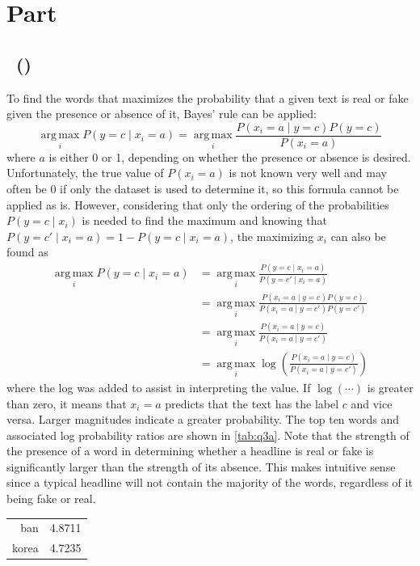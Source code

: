 \documentclass{article}
\DeclareMathOperator*{\argmax}{arg\,max}
\newcommand{\enterproblemHeader}[1]{
}
\newcommand{\exitproblemHeader}[1]{
}
\newcounter{problem} %
\newcommand{\problemName}{}
\newenvironment{problem}[1][Part \theproblem]{ %
	\stepcounter{problem} %
	\renewcommand{\problemName}{#1} %
	\section{\problemName} %
	\enterproblemHeader{\problemName} %
}{
	\exitproblemHeader{\problemName} %
}
\newcounter{subproblem}[problem]
\newcommand{\subproblemName}{}
\newenvironment{subproblem}[1][\theproblem~(\alph{subproblem})]{ %
	\stepcounter{subproblem}
	\renewcommand{\subproblemName}{#1} %
	\subsection{\subproblemName} %
	\enterproblemHeader{\subproblemName} %
}{
	\enterproblemHeader{\problemName} %
}
\begin{document}
\FloatBarrier
\begin{problem}
	
	\begin{subproblem}
		To find the words that maximizes the probability that a given text is real or fake given the presence or absence of it, Bayes' rule can be applied:
		\begin{equation*}
			\argmax \limits_{i} P(y = c \mid x_i = a) = \argmax \limits_{i} \frac{P(x_i = a \mid y = c)P(y = c)}{P(x_i = a)}
		\end{equation*}
		where \(a\) is either 0 or 1, depending on whether the presence or absence is desired. Unfortunately, the true value of \(P(x_i = a)\) is not known very well and may often be 0 if only the dataset is used to determine it, so this formula cannot be applied as is. However, considering that only the ordering of the probabilities \(P(y = c \mid x_i)\) is needed to find the maximum and knowing that \(P(y = c' \mid x_i = a) = 1 - P(y = c \mid x_i = a)\), the maximizing \(x_i\) can also be found as
		\begin{align*}
			\argmax \limits_{i} P(y = c \mid x_i = a) &= \argmax \limits_{i} \frac{P(y = c \mid x_i = a)}{P(y = c' \mid x_i = a)}\\
			&= \argmax \limits_{i} \frac{P(x_i = a \mid y = c)P(y = c)}{P(x_i = a \mid y = c')P(y = c')} \\
			&= \argmax \limits_{i} \frac{P(x_i = a \mid y = c)}{P(x_i = a \mid y = c')} \\
			&= \argmax \limits_{i} \log(\frac{P(x_i = a \mid y = c)}{P(x_i = a \mid y = c')})
		\end{align*}
		where the log was added to assist in interpreting the value. If \(\log(\cdots)\) is greater than zero, it means that \(x_i = a\) predicts that the text has the label \(c\) and vice versa. Larger magnitudes indicate a greater probability. The top ten words and associated log probability ratios are shown in \cref{tab:q3a}. Note that the strength of the presence of a word in determining whether a headline is real or fake is significantly larger than the strength of its absence. This makes intuitive sense since a typical headline will not contain the majority of the words, regardless of it being fake or real.
		\begin{table}
			\begin{subtable}{0.25\linewidth}
				\centering
				\begin{tabular}{rS}
					ban           & 4.8711 \\
					korea         & 4.7235 \\

\end{tabular}
\end{subtable}
\end{table}
\end{subproblem}
\end{problem}
\end{document}
